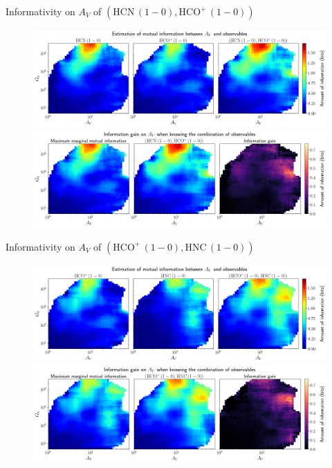 \documentclass{beamer}
\begin{document}
\begin{frame}{Informativity on $A_V$ of $\left(\mathrm{HCN\,(1-0)},\mathrm{HCO^+\,(1-0)}\right)$}
    \begin{figure}
        \centering
        \includegraphics[width=0.95\linewidth]{../mi/av__hcn10_hcop10_mi.png}
        \vfill
        \includegraphics[width=0.95\linewidth]{../mi/av__hcn10_hcop10_mi_gain.png}
    \end{figure}
\end{frame}

\begin{frame}{Informativity on $A_V$ of $\left(\mathrm{HCO^+\,(1-0)},\mathrm{HNC\,(1-0)}\right)$}
    \begin{figure}
        \centering
        \includegraphics[width=0.95\linewidth]{../mi/av__hcop10_hnc10_mi.png}
        \vfill
        \includegraphics[width=0.95\linewidth]{../mi/av__hcop10_hnc10_mi_gain.png}
    \end{figure}
\end{frame}
\end{document}
